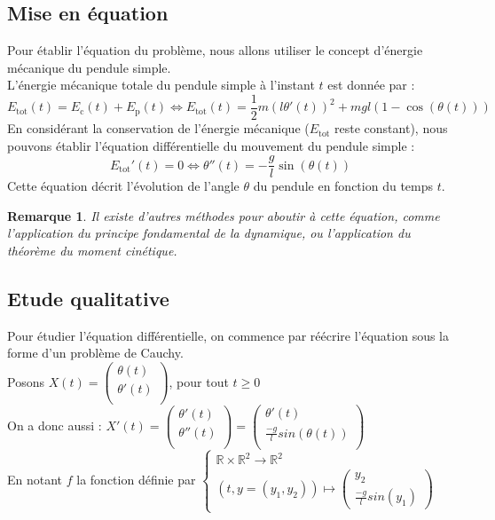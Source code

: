 \documentclass[9pt,a4paper]{article}
\newtheorem{rem}{Remarque}
\begin{document}
\subsection{Mise en équation}
Pour établir l'équation du problème, nous allons utiliser le concept d'énergie mécanique du pendule simple.\\
L'énergie mécanique totale du pendule simple à l'instant $t$ est donnée par :
\[ E_{\text{tot}}(t) = E_{\text{c}}(t) +  E_{\text{p}}(t) \Leftrightarrow E_{\text{tot}}(t) = \frac{1}{2}m(l\theta'(t))^2 + mgl(1 - \cos(\theta(t))) \]
En considérant la conservation de l'énergie mécanique ($E_{\text{tot}}$ reste constant), nous pouvons établir l'équation différentielle du mouvement du pendule simple :
\[E_{\text{tot}}'(t) = 0 \Leftrightarrow \theta''(t) = -\frac{g}{l}\sin(\theta(t))\]
Cette équation décrit l'évolution de l'angle $\theta$ du pendule en fonction du temps $t$.
\begin{tcolorbox}
    \begin{rem}
        Il existe d'autres méthodes pour aboutir à cette équation, comme l'application du principe fondamental de la dynamique, ou l'application du théorème du moment cinétique.
    \end{rem}
\end{tcolorbox}

\subsection{Etude qualitative}
Pour étudier l'équation différentielle, on commence par réécrire l'équation sous la forme d'un problème de Cauchy.\\
Posons $X(t) = \begin{pmatrix}\theta(t) \\\theta'(t) \\\end{pmatrix}$, pour tout $t\geq0$
\\On a donc aussi : $X'(t) = \begin{pmatrix}\theta'(t) \\\theta''(t) \\\end{pmatrix} = \begin{pmatrix}\theta'(t) \\\frac{-g}l sin(\theta(t)) \\\end{pmatrix}$
\\En notant $f$ la fonction définie par $\begin{cases}
  \mathbb{R} \times \mathbb{R}^2 \longrightarrow \mathbb{R}^2\\
  (t,y=(y_1,y_2)) \longmapsto \begin{pmatrix}y_2 \\\frac{-g}l sin(y_1) \end{pmatrix} \end{cases}$
\end{document}
